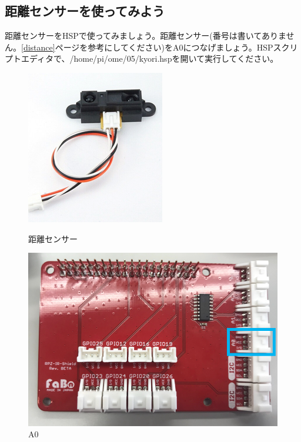 \subsection{距離センサーを使ってみよう}
距離センサーをHSPで使ってみましょう。距離センサー(番号は書いてありません。\ref{distance}ページを参考にしてください)をA0につなげましょう。HSPスクリプトエディタで、/home/pi/ome/05/kyori.hspを開いて実行してください。
\begin{figure}[H]
  \begin{minipage}[t]{0.3\columnwidth}
    \centering
 \includegraphics[width=\linewidth]{images/chap05/text05-img031.png}
    \caption{距離センサー}
  \end{minipage}
  \begin{minipage}[t]{0.5\columnwidth}
    \centering
    \includegraphics[width=\linewidth]{images/chap05/text05-img030.png}
    \caption{A0}
  \end{minipage}
\end{figure}

